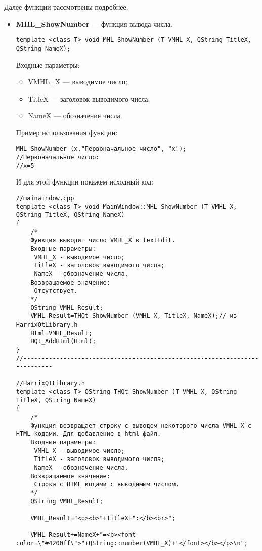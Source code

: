 \documentclass[a4paper,12pt]{article}
\begin{document}
Далее функции рассмотрены подробнее.

\begin{itemize}
\item \textbf{MHL\_ShowNumber} --- функция вывода числа. 
\begin{lstlisting}[label=examplefunction13, caption=Синтаксис функции MHL\_ShowNumber]
template <class T> void MHL_ShowNumber (T VMHL_X, QString TitleX, QString NameX);
\end{lstlisting}
Входные параметры: 
\begin{itemize}   
    \item  VMHL\_X --- выводимое число;
     \item TitleX --- заголовок выводимого числа;
     \item NameX --- обозначение числа.
\end{itemize}
Пример использования функции:
\begin{lstlisting}[label=examplefunction10, caption=Пример использования MHL\_ShowNumber]
MHL_ShowNumber (x,"Первоначальное число", "x");
//Первоначальное число:
//x=5
\end{lstlisting}
И для этой функции покажем исходный код:
\begin{lstlisting}[label=examplefunction11, caption=Реализация функции MHL\_ShowNumber]
//mainwindow.cpp
template <class T> void MainWindow::MHL_ShowNumber (T VMHL_X, QString TitleX, QString NameX)
{
    /*
    Функция выводит число VMHL_X в textEdit.
    Входные параметры:
     VMHL_X - выводимое число;
     TitleX - заголовок выводимого числа;
     NameX - обозначение числа.
    Возвращаемое значение:
     Отсутствует.
    */
    QString VMHL_Result;
    VMHL_Result=THQt_ShowNumber (VMHL_X, TitleX, NameX);// из HarrixQtLibrary.h
    Html=VMHL_Result;
    HQt_AddHtml(Html);
}
//---------------------------------------------------------------------------

//HarrixQtLibrary.h
template <class T> QString THQt_ShowNumber (T VMHL_X, QString TitleX, QString NameX)
{
    /*
    Функция возвращает строку с выводом некоторого числа VMHL_X с HTML кодами. Для добавление в html файл.
    Входные параметры:
     VMHL_X - выводимое число;
     TitleX - заголовок выводимого числа;
     NameX - обозначение числа.
    Возвращаемое значение:
     Строка с HTML кодами с выводимым числом.
    */
    QString VMHL_Result;

    VMHL_Result="<p><b>"+TitleX+":</b><br>";

    VMHL_Result+=NameX+"=<b><font color=\"#4200ff\">"+QString::number(VMHL_X)+"</font></b></p>\n";


\end{lstlisting}
\end{itemize}
\end{document}
